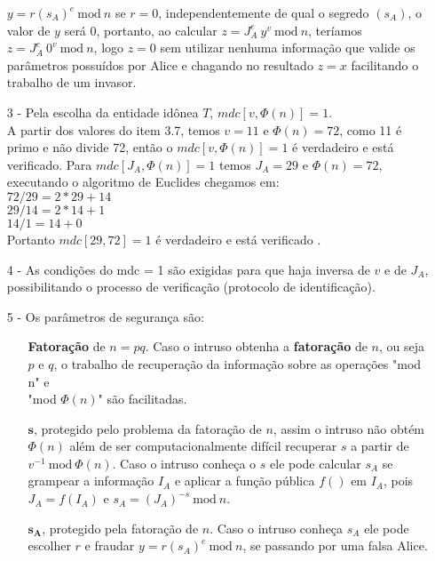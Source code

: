 \documentclass[12pt]{article}
\newcommand{\modd}{\ \text{mod}\ }
\begin{document}
\begin{itemize}
				$y = r(s_A)^{e} \modd n$ se $r = 0$, independentemente de
				qual o segredo $(s_A)$, o valor de $y$ será 0, portanto, ao
				calcular $z = J_A^{e} \ y^v \modd n$, teríamos 
				$z = J_A^{e} \ 0^v \modd n$, logo $z = 0$ sem utilizar nenhuma
				informação que valide os parâmetros possuídos por Alice e chagando
				no resultado $z = x$ facilitando o trabalho de um invasor.
			\item[3 -]
				Pela escolha da entidade idônea $T$, $mdc[v, \Phi(n)] = 1$.\\
				A partir dos valores do item 3.7, temos $v = 11$ e
				$\Phi(n) = 72$, como 11 é primo e não divide 72, então o
				$mdc[v, \Phi(n)] = 1$ é verdadeiro e está verificado.
				\newpage
				Para $mdc[J_A, \Phi(n)] = 1$ temos $J_A = 29$ e $\Phi(n) = 72$,
				executando o algoritmo de Euclides chegamos em:\\
				$72/29 = 2*29 +  14$\\
				$29/14 = 2*14 + 1$\\
				$14/1 = 14 + 0$\\
				Portanto $mdc[29, 72] = 1$ é verdadeiro e está verificado .
			\item[4 -]
				As condições do mdc = 1 são exigidas para que haja inversa de $v$
				e de $J_A$, possibilitando o processo de verificação (protocolo
				de identificação).
			\item[5 -]
				Os parâmetros de segurança são:
				\begin{itemize}
					\item[]
						\textbf{Fatoração} de $n = pq$. Caso o intruso
						obtenha a \textbf{fatoração} de $n$, ou seja $p$ e $q$,
						o trabalho de recuperação
						da informação sobre as operações "mod n" e \\
						"mod $\Phi(n)$" são facilitadas.
					\item[]
						$\mathbf{s}$, protegido pelo problema da fatoração de $n$,
						assim o intruso não obtém $\Phi(n)$ além de ser 
						computacionalmente difícil recuperar $s$ a partir de
						$v^{-1} \modd \Phi(n)$. Caso o intruso conheça o $s$ ele
						pode calcular $s_A$ se grampear a informação $I_A$ e
						aplicar a função pública $f()$ em $I_A$, pois $J_A = f(I_A)$
						e $s_A = (J_A)^{-s} \modd n$.
					\item[]
						$\mathbf{s_A}$, protegido pela fatoração de $n$. Caso
						o intruso conheça $s_A$ ele pode escolher $r$ e fraudar 
						$y = r(s_A)^{e} \modd n$, se passando por uma falsa
						Alice.
				\end{itemize}

\end{itemize}
\end{document}
